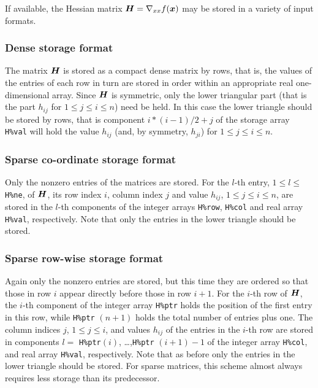 \documentclass{galahad}
\begin{document}
\galmatrix
If available, the Hessian matrix ${\bm{H}} = \nabla_{xx} f({\bm{x}})$
may be stored in a variety of input formats.

\subsubsection{Dense storage format}\label{dense}
The matrix ${\bm{H}}$ is stored as a compact
dense matrix by rows, that is, the values of the entries of each row in turn are
stored in order within an appropriate real one-dimensional array.
Since ${\bm{H}}$ is symmetric, only the lower triangular part (that is the part
$h_{ij}$ for $1 \leq j \leq i \leq n$) need be held. In this case
the lower triangle should be stored by rows, that is
component $i \ast (i-1)/2 + j$ of the storage array {\tt H\%val}
will hold the value $h_{ij}$ (and, by symmetry, $h_{ji}$)
for $1 \leq j \leq i \leq n$.

\subsubsection{Sparse co-ordinate storage format}\label{coordinate}
Only the nonzero entries of the matrices are stored.
For the $l$-th entry, $1 \leq l \leq$ {\tt H\%ne}, of ${\bm{H}}$, 
its row index $i$, column index $j$ and value $h_{ij}$,
$1 \leq j \leq i \leq n$,
are stored in the $l$-th components of the integer arrays {\tt H\%row},
{\tt H\%col} and real array {\tt H\%val}, respectively.
Note that only the entries in the lower triangle should be stored.

\subsubsection{Sparse row-wise storage format}\label{rowwise}
Again only the nonzero entries are stored, but this time
they are ordered so that those in row $i$ appear directly before those
in row $i+1$. For the $i$-th row of ${\bm{H}}$, the $i$-th component of the
integer array {\tt H\%ptr} holds the position of the first entry in this row,
while {\tt H\%ptr} $(n+1)$ holds the total number of entries plus one.
The column indices $j$, $1 \leq j \leq i$, and values $h_{ij}$ of the
entries in the $i$-th row are stored in components
$l =$ {\tt H\%ptr}$(i)$, \ldots ,{\tt H\%ptr} $(i+1)-1$ of the
integer array {\tt H\%col}, and real array {\tt H\%val}, respectively.
Note that as before only the entries in the lower triangle should be stored.
For sparse matrices, this scheme almost always requires less storage than
its predecessor.
\end{document}
